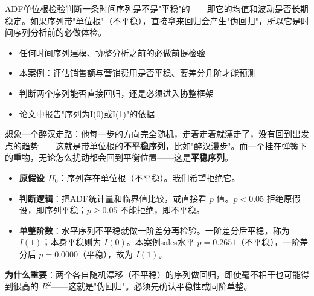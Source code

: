\begin{algointro}
ADF单位根检验判断一条时间序列是不是"平稳"的——即它的均值和波动是否长期稳定。如果序列带"单位根"（不平稳），直接拿来回归会产生"伪回归"，所以它是时间序列分析前的必做体检。
\end{algointro}

\begin{algoscene}
\begin{itemize}
    \item 任何时间序列建模、协整分析之前的必做前提检验
    \item 本案例：评估销售额与营销费用是否平稳、要差分几阶才能预测
    \item 判断两个序列能否直接回归，还是必须进入协整框架
    \item 论文中报告"序列为I(0)或I(1)"的依据
\end{itemize}
\end{algoscene}

\begin{algoprinciple}
想象一个醉汉走路：他每一步的方向完全随机，走着走着就漂走了，没有回到出发点的趋势——这就是带单位根的\textbf{不平稳序列}，比如"醉汉漫步"。而一个挂在弹簧下的重物，无论怎么扰动都会回到平衡位置——这是\textbf{平稳序列}。

\begin{itemize}
    \item \textbf{原假设 $H_0$}：序列存在单位根（不平稳）。我们希望拒绝它。
    \item \textbf{判断逻辑}：把ADF统计量和临界值比较，或直接看 $p$ 值。$p<0.05$ 拒绝原假设，即序列平稳；$p\geq0.05$ 不能拒绝，即不平稳。
    \item \textbf{单整阶数}：水平序列不平稳就做一阶差分再检验。一阶差分后平稳，称为 $I(1)$；本身平稳则为 $I(0)$。本案例sales水平 $p=0.2651$（不平稳），一阶差分后 $p=0.0000$（平稳），故为 $I(1)$。
\end{itemize}

\textbf{为什么重要}：两个各自随机漂移（不平稳）的序列做回归，即使毫不相干也可能得到很高的 $R^2$——这就是"伪回归"。必须先确认平稳性或同阶单整。
\end{algoprinciple}

